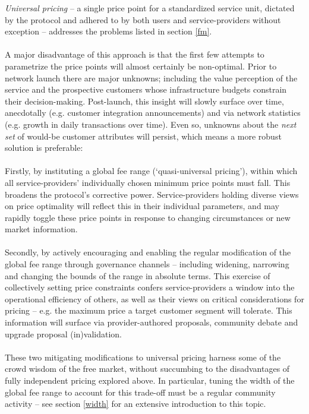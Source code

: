 \documentclass[longbibliography,nofootinbib]{revtex4-1}
\begin{document}
\textit{Universal pricing} – a single price point for a standardized service unit, dictated by the protocol and adhered to by both users and service-providers without exception – addresses the problems listed in section \ref{fm}. 
\\\\
A major disadvantage of this approach is that the first few attempts to parametrize the price points will almost certainly be non-optimal. Prior to network launch there are major unknowns; including the value perception of the service and the prospective customers whose infrastructure budgets constrain their decision-making. Post-launch, this insight will slowly surface over time, anecdotally (e.g. customer integration announcements) and via network statistics (e.g. growth in daily transactions over time). Even so, unknowns about the \textit{next set} of would-be customer attributes will persist, which means a more robust solution is preferable: 
\\\\
Firstly, by instituting a global fee range (‘quasi-universal pricing’), within which all service-providers’ individually chosen minimum price points must fall. This broadens the protocol's corrective power. Service-providers holding diverse views on price optimality will reflect this in their individual parameters, and may rapidly toggle these price points in response to changing circumstances or new market information.
\\\\
Secondly, by actively encouraging and enabling the regular modification of the global fee range through governance channels – including widening, narrowing and changing the bounds of the range in absolute terms. This exercise of collectively setting price constraints confers service-providers a window into the operational efficiency of others, as well as their views on critical considerations for pricing – e.g. the maximum price a target customer segment will tolerate. This information will surface via provider-authored proposals, community debate and upgrade proposal (in)validation. 
\\\\
These two mitigating modifications to universal pricing harness some of the crowd wisdom of the free market, without succumbing to the disadvantages of fully independent pricing explored above. In particular, tuning the width of the global fee range to account for this trade-off must be a regular community activity – see section \ref{width} for an extensive introduction to this topic. 
\end{document}
